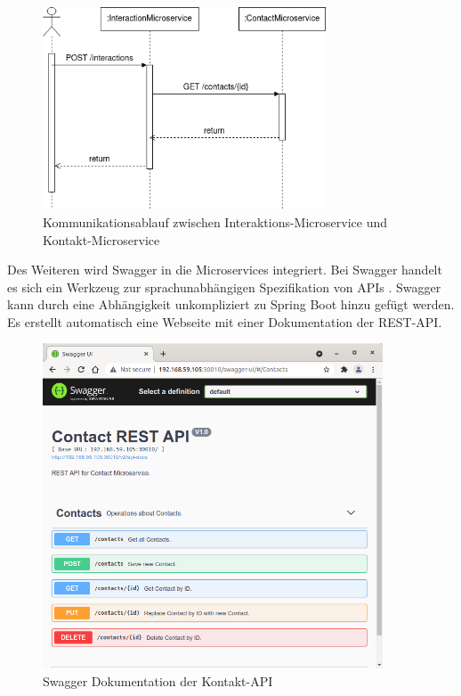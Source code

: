 \begin{figure}[H] 
    \centering
    \includegraphics[width=0.75\textwidth]{figures/UMLSequenzdiagramm.png}
    \caption{Kommunikationsablauf zwischen Interaktions-Microservice und Kontakt-Microservice}
\end{figure}

Des Weiteren wird Swagger in die Microservices integriert. Bei Swagger handelt es sich ein Werkzeug zur sprachunabhängigen Spezifikation von \acp{API} \parencite[vgl.][]{smartbearsoftwareSwagger2022}. Swagger kann durch eine Abhängigkeit unkompliziert zu Spring Boot hinzu gefügt werden. Es erstellt automatisch eine Webseite mit einer Dokumentation der \ac{REST}-\ac{API}. 

\begin{figure}[H] 
    \centering
    \includegraphics[width=0.9\textwidth]{figures/KontaktAPISwagger.png}
    \caption{Swagger Dokumentation der Kontakt-API}
\end{figure}

